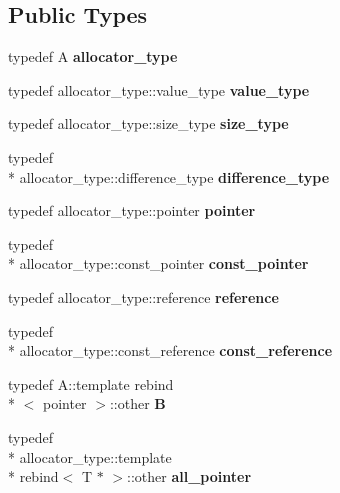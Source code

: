 \subsection*{Public Types}
\begin{DoxyCompactItemize}
\item 
\hypertarget{classmy__deque_a34236f0fef930decd11dc683f40a38be}{typedef A {\bfseries allocator\-\_\-type}}\label{classmy__deque_a34236f0fef930decd11dc683f40a38be}

\item 
\hypertarget{classmy__deque_ae9c156c405acc57623a4601ce755596f}{typedef allocator\-\_\-type\-::value\-\_\-type {\bfseries value\-\_\-type}}\label{classmy__deque_ae9c156c405acc57623a4601ce755596f}

\item 
\hypertarget{classmy__deque_a61e5e5317fe72a381ce4d45f09544b02}{typedef allocator\-\_\-type\-::size\-\_\-type {\bfseries size\-\_\-type}}\label{classmy__deque_a61e5e5317fe72a381ce4d45f09544b02}

\item 
\hypertarget{classmy__deque_ac85676cb2492fbc9bbc6f1a30e9d3c73}{typedef \\*
allocator\-\_\-type\-::difference\-\_\-type {\bfseries difference\-\_\-type}}\label{classmy__deque_ac85676cb2492fbc9bbc6f1a30e9d3c73}

\item 
\hypertarget{classmy__deque_a58e82fc365a3b086367479515e1515be}{typedef allocator\-\_\-type\-::pointer {\bfseries pointer}}\label{classmy__deque_a58e82fc365a3b086367479515e1515be}

\item 
\hypertarget{classmy__deque_a8fea5edeb2b2cf3dd1246dc3abf9b71b}{typedef \\*
allocator\-\_\-type\-::const\-\_\-pointer {\bfseries const\-\_\-pointer}}\label{classmy__deque_a8fea5edeb2b2cf3dd1246dc3abf9b71b}

\item 
\hypertarget{classmy__deque_a4c34c14f397b7676445b37c87003116b}{typedef allocator\-\_\-type\-::reference {\bfseries reference}}\label{classmy__deque_a4c34c14f397b7676445b37c87003116b}

\item 
\hypertarget{classmy__deque_ad50d8b378580088cf77fa43f0640e49c}{typedef \\*
allocator\-\_\-type\-::const\-\_\-reference {\bfseries const\-\_\-reference}}\label{classmy__deque_ad50d8b378580088cf77fa43f0640e49c}

\item 
\hypertarget{classmy__deque_a1a55c016646bba79086d90d3cccde143}{typedef A\-::template rebind\\*
$<$ pointer $>$\-::other {\bfseries B}}\label{classmy__deque_a1a55c016646bba79086d90d3cccde143}

\item 
\hypertarget{classmy__deque_a87d923dafdeeadf5c013f69a73a7daa7}{typedef \\*
allocator\-\_\-type\-::template \\*
rebind$<$ T $\ast$ $>$\-::other {\bfseries all\-\_\-pointer}}\label{classmy__deque_a87d923dafdeeadf5c013f69a73a7daa7}

\end{DoxyCompactItemize}
